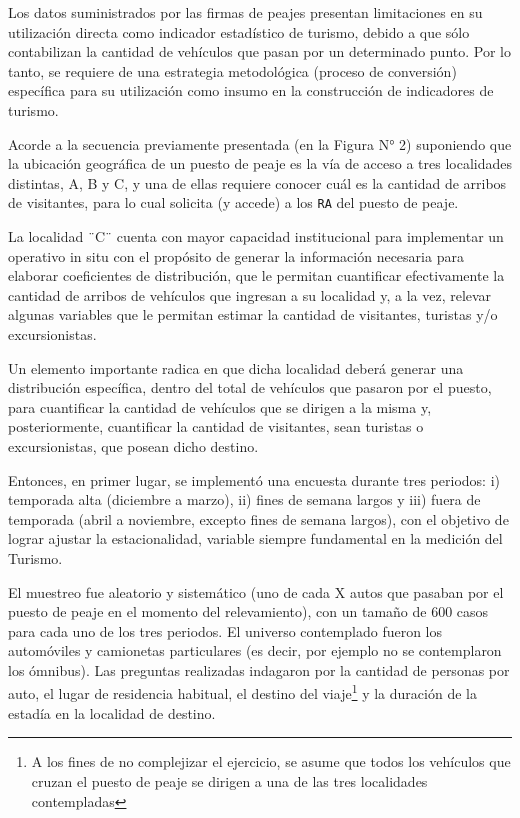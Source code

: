 \documentclass[
]{book}
\begin{document}
Los datos suministrados por las firmas de peajes presentan limitaciones en su utilización directa como indicador estadístico de turismo, debido a que sólo contabilizan la cantidad de vehículos que pasan por un determinado punto. Por lo tanto, se requiere de una estrategia metodológica (proceso de conversión) específica para su utilización como insumo en la construcción de indicadores de turismo.

Acorde a la secuencia previamente presentada (en la Figura N° 2) suponiendo que la ubicación geográfica de un puesto de peaje es la vía de acceso a tres localidades distintas, A, B y C, y una de ellas requiere conocer cuál es la cantidad de arribos de visitantes, para lo cual solicita (y accede) a los \texttt{RA} del puesto de peaje.

La localidad ¨C¨ cuenta con mayor capacidad institucional para implementar un operativo in situ con el propósito de generar la información necesaria para elaborar coeficientes de distribución, que le permitan cuantificar efectivamente la cantidad de arribos de vehículos que ingresan a su localidad y, a la vez, relevar algunas variables que le permitan estimar la cantidad de visitantes, turistas y/o excursionistas.

Un elemento importante radica en que dicha localidad deberá generar una distribución específica, dentro del total de vehículos que pasaron por el puesto, para cuantificar la cantidad de vehículos que se dirigen a la misma y, posteriormente, cuantificar la cantidad de visitantes, sean turistas o excursionistas, que posean dicho destino.

Entonces, en primer lugar, se implementó una encuesta durante tres periodos: i) temporada alta (diciembre a marzo), ii) fines de semana largos y iii) fuera de temporada (abril a noviembre, excepto fines de semana largos), con el objetivo de lograr ajustar la estacionalidad, variable siempre fundamental en la medición del Turismo.

El muestreo fue aleatorio y sistemático (uno de cada X autos que pasaban por el puesto de peaje en el momento del relevamiento), con un tamaño de 600 casos para cada uno de los tres periodos. El universo contemplado fueron los automóviles y camionetas particulares (es decir, por ejemplo no se contemplaron los ómnibus). Las preguntas realizadas indagaron por la cantidad de personas por auto, el lugar de residencia habitual, el destino del viaje\footnote{A los fines de no complejizar el ejercicio, se asume que todos los vehículos que cruzan el puesto de peaje se dirigen a una de las tres localidades contempladas} y la duración de la estadía en la localidad de destino.
\end{document}
